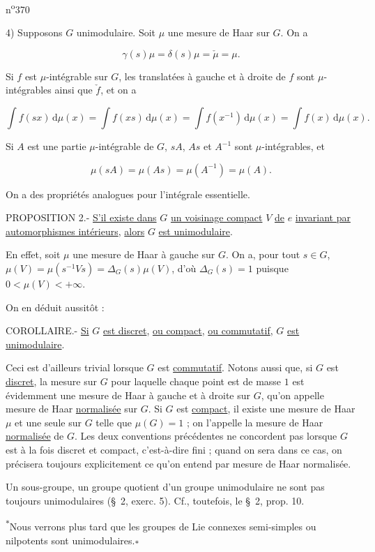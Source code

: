 
 \hfill n\textsuperscript{o}370

4) Supposons $G$ unimodulaire. Soit $\mu$ une mesure de Haar sur $G$. On a

\[
\gamma(s)\mu=\delta(s)\mu=\check{\mu}=\mu. \tag*{(26)}
\]

Si $f$ est $\mu$-intégrable sur $G$, les translatées à gauche et à droite de $f$ sont $\mu$-intégrables ainsi que $\check f$, et on a

\[
\int f(sx)\,\mathrm{d}\mu(x)=\int f(xs)\,\mathrm{d}\mu(x)=\int f(x^{-1})\,\mathrm{d}\mu(x)=\int f(x)\,\mathrm{d}\mu(x). \tag*{(27)}
\]

Si $A$ est une partie $\mu$-intégrable de $G$, $sA$, $As$ et $A^{-1}$ sont $\mu$-intégrables, et

\[
\mu(sA)=\mu(As)=\mu(A^{-1})=\mu(A). \tag*{(28)}
\]


On a des propriétés analogues pour l'intégrale essentielle.

PROPOSITION 2.- \uline{S'il existe dans} $G$ \uline{un voisinage compact} $V$ \uline{de} $e$ \uline{invariant par automorphismes intérieurs}, \uline{alors} $G$ \uline{est unimodulaire}.

En effet, soit $\mu$ une mesure de Haar à gauche sur $G$. On a, pour tout $s\in G$, $\mu(V)=\mu(s^{-1}Vs)=\Delta_G(s)\mu(V)$, d'où $\Delta_G(s)=1$ puisque $0<\mu(V)<+\infty$.

On en déduit aussitôt :

COROLLAIRE.- \uline{Si} $G$ \uline{est discret}, \uline{ou compact}, \uline{ou commutatif}, $G$ \uline{est unimodulaire}.

Ceci est d'ailleurs trivial lorsque $G$ est \uline{commutatif}. Notons aussi que, si $G$ est \uline{discret}, la mesure sur $G$ pour laquelle chaque point est de masse $1$ est évidemment une mesure de Haar à gauche et à droite sur $G$, qu'on appelle mesure de Haar \uline{normalisée} sur $G$. Si $G$ est \uline{compact}, il existe une mesure de Haar $\mu$ et une seule sur $G$ telle que $\mu(G)=1$ ; on l'appelle la mesure de Haar \uline{normalisée} de $G$. Les deux conventions précédentes ne concordent pas lorsque $G$ est à la fois discret et compact, c'est-à-dire fini ; quand on sera dans ce cas, on précisera toujours explicitement ce qu'on entend par mesure de Haar normalisée.

Un sous-groupe, un groupe quotient d'un groupe unimodulaire ne sont pas toujours unimodulaires (\S\ 2, exerc. 5). Cf., toutefois, le \S\ 2, prop. 10.

\textsuperscript{$\ast$}Nous verrons plus tard que les groupes de Lie connexes semi-simples ou nilpotents sont unimodulaires.\textsubscript{$\ast$}
